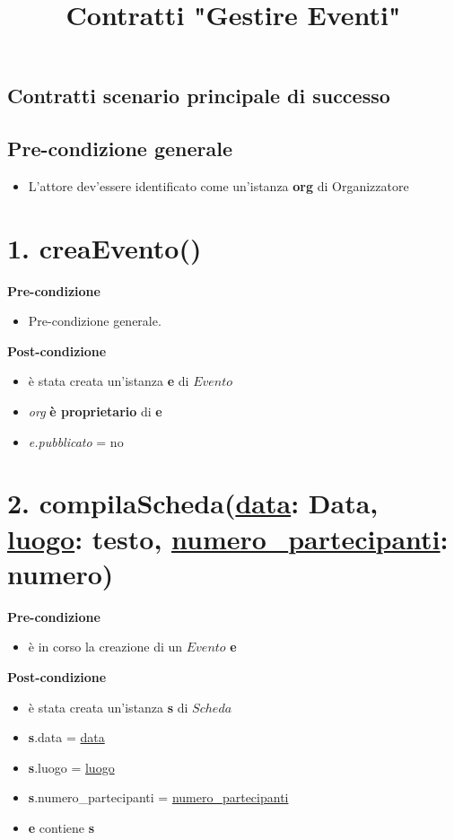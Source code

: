 \documentclass[12pt]{extarticle}
\begin{document}
\title{Contratti "Gestire Eventi"}
\date{}
\maketitle


\begin{center}
  \section*{Contratti scenario principale di successo}
\end{center}

\subsection*{Pre-condizione generale}

\begin{itemize}
  \item L'attore dev'essere identificato come un'istanza \textbf{org} di Organizzatore
\end{itemize}

\section*{1. creaEvento()}

\textbf{Pre-condizione}
\begin{itemize}
  \item Pre-condizione generale.
\end{itemize}
\textbf{Post-condizione}
\begin{itemize}
  \item è stata creata un'istanza \textbf{e} di $Evento$
  \item \textit{org} \textbf{è proprietario} di \textbf{e}
  \item \textit{e.pubblicato} = no
\end{itemize}


\section*{2. compilaScheda(\underline{data}: Data, \underline{luogo}: testo, \underline{numero\_partecipanti}: numero)}

\textbf{Pre-condizione}
\begin{itemize}
  \item è in corso la creazione di un $Evento$ \textbf{e}
\end{itemize} 
\textbf{Post-condizione} 
\begin{itemize}
  \item è stata creata un'istanza \textbf{s} di $Scheda$
  \item \textbf{s}.data = \underline{data} 
  \item \textbf{s}.luogo = \underline{luogo} 
  \item \textbf{s}.numero\_partecipanti = \underline{numero\_partecipanti}
  \item \textbf{e} contiene \textbf{s}
\end{itemize}
\end{document}
